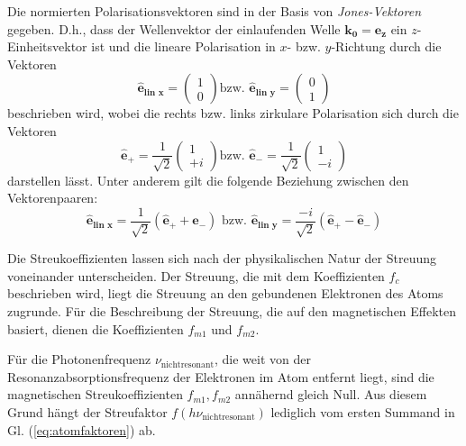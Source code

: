 \noindent
Die normierten Polarisationsvektoren sind in der Basis von \emph{Jones-Vektoren} gegeben. D.h., dass der Wellenvektor der einlaufenden Welle $\mathbf{k_0} = \mathbf{e_{z}}$ ein $z$-Einheitsvektor ist und die lineare Polarisation in $x$- bzw. $y$-Richtung durch die Vektoren
\begin{equation}
    \mathbf{\hat{e}_{\text{lin $x$}}} = \begin{pmatrix}
    1\\
    0
    \end{pmatrix}
    \text{bzw. }
    \mathbf{\hat{e}_{\text{lin $y$}}} = \begin{pmatrix}
    0\\
    1
    \end{pmatrix}
    \label{eq:lin_jones}
\end{equation}
beschrieben wird, wobei die rechts bzw. links zirkulare Polarisation sich durch die Vektoren 
\begin{equation}
    \mathbf{\hat{e}_+} = \frac{1}{\sqrt{2}}\begin{pmatrix}
    1\\
    +i
    \end{pmatrix}
    \text{bzw. }
    \mathbf{\hat{e}_-} = \frac{1}{\sqrt{2}}\begin{pmatrix}
    1\\
    -i
    \end{pmatrix}
    \label{eq:circ_jones}
\end{equation}
darstellen lässt. Unter anderem gilt die folgende Beziehung zwischen den Vektorenpaaren:
\begin{equation}
    \mathbf{\hat{e}_{\text{lin $x$}}} = \frac{1}{\sqrt{2}}(\mathbf{\hat{e}_+} + \mathbf{\hat{e}_-}) \text{ bzw. } \mathbf{\hat{e}_{\text{lin $y$}}} = \frac{-i}{\sqrt{2}}(\mathbf{\hat{e}_+} - \mathbf{\hat{e}_-})
    \label{eq:lin_circ_jones}
\end{equation}

\noindent
Die Streukoeffizienten lassen sich nach der physikalischen Natur der Streuung voneinander unterscheiden. Der Streuung, die mit dem Koeffizienten $f_c$ beschrieben wird, liegt die Streuung an den gebundenen Elektronen des Atoms zugrunde. Für die Beschreibung der Streuung, die auf den magnetischen Effekten basiert, dienen die Koeffizienten $f_{m1}$ und $f_{m2}$.


\noindent
Für die Photonenfrequenz $\nu_{\text{nichtresonant}}$, die weit von der Resonanzabsorptionsfrequenz der Elektronen im Atom entfernt liegt, sind die magnetischen Streukoeffizienten  $f_{m1}, f_{m2}$ annähernd gleich Null. Aus diesem Grund hängt der Streufaktor $f(h\nu_{\text{nichtresonant}})$ lediglich vom ersten Summand in Gl. (\ref{eq:atomfaktoren}) ab.
%     

